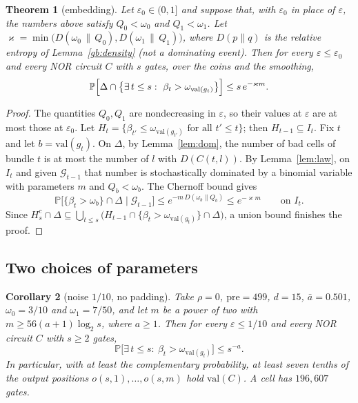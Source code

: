 \documentclass[11pt]{amsart}
\newtheorem{theorem}{Theorem}
\newtheorem{corollary}[theorem]{Corollary}
\theoremstyle{definition}
\theoremstyle{remark}
\newcommand{\eps}{\varepsilon}
\newcommand{\val}{\mathrm{val}}
\newcommand{\PP}{\mathbb{P}}
\begin{document}
\begin{theorem}[embedding]\label{thm:embed}
Let $\eps_0\in(0,1]$ and suppose that, with $\eps_0$ in place of $\eps$, the numbers above satisfy
$Q_0<\omega_0$ and $Q_1<\omega_1$. Let
$\varkappa=\min\bigl(D(\omega_0\,\|\,Q_0),D(\omega_1\,\|\,Q_1)\bigr)$, where $D(p\|q)$ is the
relative entropy of Lemma~\ref{gb:density} (not a dominating event). Then for every
$\eps\le\eps_0$ and every NOR circuit $C$ with $s$ gates, over the coins and the smoothing,
\[
\PP\Bigl[\Delta\cap\bigl\{\exists\,t\le s:\ \beta_t>\omega_{\val(g_t)}\bigr\}\Bigr]\le s\,e^{-\varkappa m}.
\]
\end{theorem}

\begin{proof}
The quantities $Q_0,Q_1$ are nondecreasing in $\eps$, so their values at $\eps$ are at most those at
$\eps_0$. Let $H_t=\{\beta_{t'}\le\omega_{\val(g_{t'})}\text{ for all }t'\le t\}$; then
$H_{t-1}\subseteq I_t$. Fix $t$ and let $b=\val(g_t)$. On $\Delta$, by Lemma~\ref{lem:dom}, the
number of bad cells of bundle $t$ is at most the number of $l$ with $D(C(t,l))$. By
Lemma~\ref{lem:law}, on $I_t$ and given $\mathcal G_{t-1}$ that number is stochastically dominated
by a binomial variable with parameters $m$ and $Q_b<\omega_b$. The Chernoff bound gives
\[
\PP\bigl[\{\beta_t>\omega_b\}\cap\Delta\mid\mathcal G_{t-1}\bigr]\le e^{-m\,D(\omega_b\|Q_b)}\le e^{-\varkappa m}\qquad\text{on }I_t .
\]
Since $H_s^c\cap\Delta\subseteq\bigcup_{t\le s}\bigl(H_{t-1}\cap\{\beta_t>\omega_{\val(g_t)}\}\cap\Delta\bigr)$,
a union bound finishes the proof.
\end{proof}

\subsection{Two choices of parameters}

\begin{corollary}[noise $1/10$, no padding]\label{cor:tenth}
Take $\rho=0$, $\mathrm{pre}=499$, $d=15$, $\bar a=0.501$, $\omega_0=3/10$ and $\omega_1=7/50$, and
let $m$ be a power of two with $m\ge56(a+1)\log_2s$, where $a\ge1$. Then for every $\eps\le1/10$
and every NOR circuit $C$ with $s\ge2$ gates,
\[
\PP\bigl[\exists\,t\le s:\ \beta_t>\omega_{\val(g_t)}\bigr]\le s^{-a}.
\]
In particular, with at least the complementary probability, at least seven tenths of the
output positions $o(s,1),\dots,o(s,m)$ hold $\val(C)$. A cell has $196{,}607$ gates.
\end{corollary}
\end{document}
